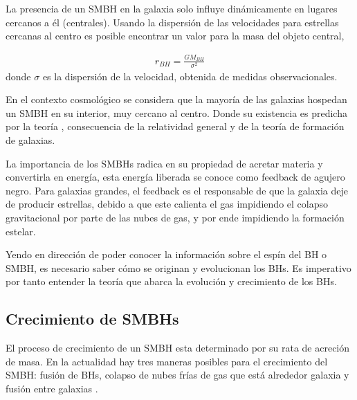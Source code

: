 La presencia de un SMBH en la galaxia solo influye dinámicamente en lugares cercanos a él (centrales). Usando la dispersión de las velocidades para estrellas cercanas al centro es posible encontrar un valor para la masa del objeto central, 

\begin{align}
    r_{BH}=\frac{GM_{BH}}{\sigma^{2}}
\end{align}
donde $\sigma$ es la dispersión de la velocidad, obtenida de medidas observacionales. 

En el contexto cosmológico se considera que la mayoría de las galaxias hospedan un SMBH en su interior, muy cercano al centro. Donde su existencia es predicha por la teoría \cite{schneider2006},  consecuencia de la relatividad general y de la teoría de formación de galaxias. 

La importancia de los SMBHs radica en su propiedad de acretar materia y convertirla en energía, esta energía liberada se conoce como feedback de agujero negro. Para galaxias grandes, el feedback es el responsable de que la galaxia deje de producir estrellas, debido a que este calienta el gas  impidiendo el colapso gravitacional por parte de las nubes de gas, y por ende impidiendo la formación estelar.

Yendo en dirección de poder conocer la información sobre el espín del BH o SMBH, es necesario saber cómo se originan y evolucionan los BHs. Es imperativo por tanto entender la teoría que abarca la evolución y crecimiento de los BHs.
\subsection{Crecimiento de SMBHs}
\label{subsec: Crecimiento_SMBHs}

El proceso de crecimiento de un SMBH esta determinado por su rata de acreción de masa. En la actualidad hay tres maneras posibles para el crecimiento del SMBH: fusión de BHs, colapso de nubes frías de gas que está alrededor galaxia y fusión entre galaxias \cite{fanidakis2011}.
